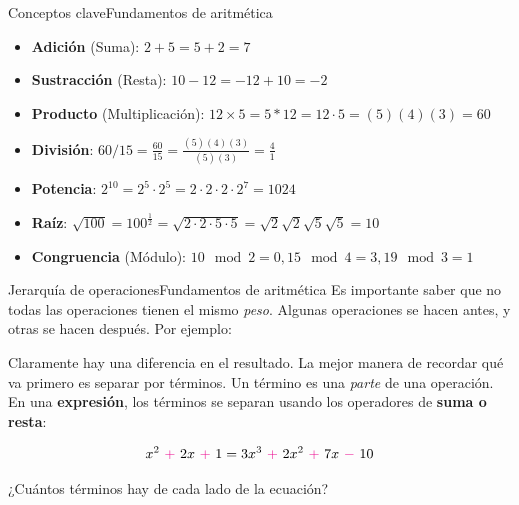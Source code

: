 \documentclass[spanish]{beamer}
\begin{document}
\begin{frame}{Conceptos clave}{Fundamentos de aritmética}
    \begin{itemize}
        \item<1-> { \textbf{Adición} (Suma): \hfill $2 + 5 = 5 + 2 = 7$}
        \item<2-> { \textbf{Sustracción} (Resta): \hfill $10 - 12 = -12 + 10 = -2$}
        \item<3-> { \textbf{Producto} (Multiplicación): \hfill $12 \times 5 = 5 * 12 = 12 \cdot 5 = (5)(4)(3) = 60$}
        \item<4-> { \textbf{División}: \hfill $60 / 15 =  \frac{60}{15} = \frac{(5)(4)(3)}{(5)(3)} = \frac{4}{1}$}
        \item<5-> { \textbf{Potencia}: \hfill $2^{10} = 2^5 \cdot 2^5 = 2 \cdot 2 \cdot 2 \cdot 2^7 = 1024$}
        \item<6-> { \textbf{Raíz}: \hfill $\sqrt{100} = 100^{\frac{1}{2}} = \sqrt{2 \cdot 2 \cdot 5 \cdot 5} = \sqrt{2} \sqrt{2} \sqrt{5} \sqrt{5} = 10$}
        \item<7-> \textbf{Congruencia} (Módulo): \hfill $10 \mod 2 = 0, 15 \mod 4 = 3, 19 \mod 3 = 1$
    \end{itemize}
\end{frame}

\begin{frame}{Jerarquía de operaciones}{Fundamentos de aritmética}
    Es importante saber que no todas las operaciones tienen el mismo \textit{peso}.
    Algunas operaciones se hacen antes, y otras se hacen después. Por ejemplo: \pause

     \pause


    Claramente hay una diferencia en el resultado. La mejor manera de recordar qué va primero es separar por \alert{términos}. \pause Un \alert{término} es una \textit{parte} de una operación. En una \textbf{expresión}, los términos se separan usando los operadores de \textbf{\color{magenta} suma o resta}:

    $$x^2 {~\color{magenta}+~} 2x {~\color{magenta}+~} 1 = 3x^3 {~\color{magenta}+~} 2x^2 {~\color{magenta}+~} 7x {~\color{magenta}-~} 10$$ \pause

    \begin{center}
        \Large
        ¿Cuántos términos hay de cada lado de la ecuación?
    \end{center}
    
\end{frame}
\end{document}
